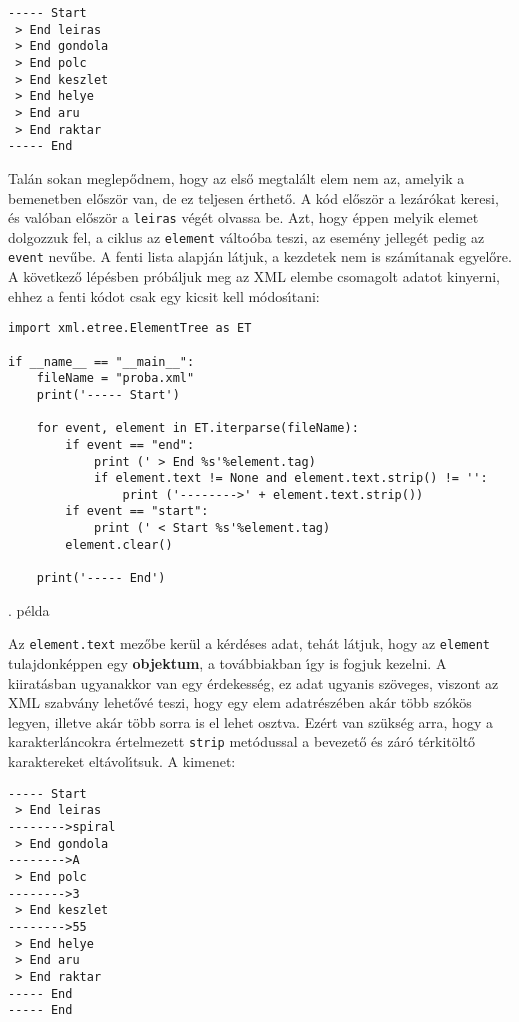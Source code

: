 \begin{Verbatim}[fontsize=\small]
----- Start
 > End leiras
 > End gondola
 > End polc
 > End keszlet
 > End helye
 > End aru
 > End raktar
----- End
\end{Verbatim}

\noindent Tal\'an sokan meglep\H{o}dnem, hogy az els\H{o} megtal\'alt elem nem az, amelyik a 
bemenetben el\H{o}sz\"or van, de ez teljesen \'erthet\H{o}. A k\'od el\H{o}sz\"or a lez\'ar\'okat 
keresi, \'es val\'oban el\H{o}sz\"or a {\tt leiras} v\'eg\'et olvassa be. Azt, hogy \'eppen melyik 
elemet dolgozzuk fel, a ciklus az {\tt element} v\'alto\'oba teszi, az esem\'eny jelleg\'et pedig 
az {\tt event} nev\H{u}be. A fenti lista alapj\'an l\'atjuk, a kezdetek nem is sz\'am\'{\i}tanak 
egyel\H{o}re. A k\"ovetkez\H{o} l\'ep\'esben pr\'ob\'aljuk meg az XML elembe csomagolt adatot 
kinyerni, ehhez a fenti k\'odot csak egy kicsit kell m\'odos\'{\i}tani:

\incminta
\begin{Verbatim}[fontsize=\small]
import xml.etree.ElementTree as ET

if __name__ == "__main__":
    fileName = "proba.xml"
    print('----- Start')
 
    for event, element in ET.iterparse(fileName):
        if event == "end":
            print (' > End %s'%element.tag)
            if element.text != None and element.text.strip() != '':
                print ('-------->' + element.text.strip())
        if event == "start":
            print (' < Start %s'%element.tag)
        element.clear()

    print('----- End')    
\end{Verbatim}
\theminta. p\'elda

\noindent Az {\tt element.text} mez\H{o}be ker\"ul a k\'erd\'eses adat, teh\'at l\'atjuk, hogy az 
{\tt element} tulajdonk\'eppen egy {\bf objektum}, a tov\'abbiakban \'{\i}gy is fogjuk kezelni. A 
kiirat\'asban ugyanakkor van egy \'erdekess\'eg, ez adat ugyanis sz\"oveges, viszont az XML szabv\'any 
lehet\H{o}v\'e teszi, hogy egy elem adatr\'esz\'eben ak\'ar t\"obb sz\'ok\"os legyen, illetve ak\'ar 
t\"obb sorra is el lehet osztva. Ez\'ert van sz\"uks\'eg arra, hogy a karakterl\'ancokra \'ertelmezett 
{\tt strip} met\'odussal a bevezet\H{o} \'es z\'ar\'o t\'erkit\"olt\H{o }karaktereket elt\'avol\'{\i}tsuk. 
A kimenet:

\begin{Verbatim}[fontsize=\small]
----- Start
 > End leiras
-------->spiral
 > End gondola
-------->A
 > End polc
-------->3
 > End keszlet
-------->55
 > End helye
 > End aru
 > End raktar
----- End
----- End
\end{Verbatim}

